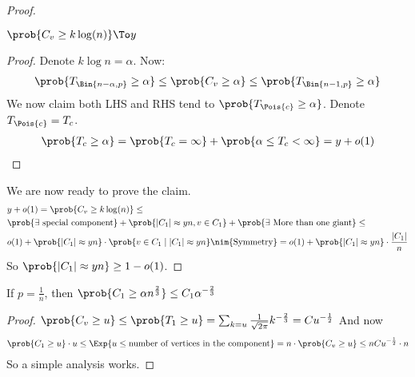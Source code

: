 \documentclass[a4paper, 11pt, oneside]{book}
\begin{document}
\begin{proof}
		\begin{prop}
			$\prob{C_v \ge k\log(n)}\To y$
		\end{prop}
		\begin{proof}
		Denote $k\log n = \alpha$. Now:
		\begin{align*}
			\prob{T_\Bin{n-\alpha,p} \ge \alpha }\le \prob{C_v \ge \alpha}\le \prob{T_\Bin{n-1,p}\ge \alpha}
		\end{align*}
		We now claim both LHS and RHS tend to $\prob{T_\Pois{c}\ge \alpha}$. Denote $T_{\Pois{c}} = T_c$. 
		\begin{align*}
			\prob{T_c \ge \alpha} = \prob{T_c = \infty} + \prob{\alpha \le T_c < \infty} = y + o(1)
		\end{align*}
		\end{proof}
		We are now ready to prove the claim. 
		\begin{align*}
			& y + o(1) =\prob{C_v \ge k\log(n)} \le\\
			& \prob{\exists \text{ special component}} + \prob{|C_1| \approx yn, v\in C_1} + \prob{\exists\text{ More than one giant}} \le\\
			& o(1) + \prob{|C_1| \approx yn}\cdot \prob{v\in C_1\mid |C_1| \approx yn} \nim{\text{Symmetry}}= o(1) + \prob{|C_1| \approx yn}\cdot \frac{|C_1|}{n}
		\end{align*}
		So $\prob{|C_1|\approx yn} \ge 1-o(1)$.
	\end{proof}
	\begin{claim}
		If $p = \frac{1}{n}$, then $\prob{C_1\ge \alpha n^{\frac{2}{3}}}\le C_1\alpha^{-\frac{2}{3}}$
	\end{claim}
	
	\begin{proof}
		$\prob{C_v \ge u}\le \prob{T_1 \ge u} = \sum_{k=u}\frac{1}{\sqrt{2\pi}}k^{-\frac{2}{3}} = Cu^{-\frac{1}{2}}$
		And now
		\begin{align*}
			\prob{C_1\ge u}\cdot u\le \Exp{u\le \text{number of vertices in the component}} = n\cdot\prob{C_v \ge u}\le nCu^{-\frac{1}{2}}\cdot n
		\end{align*}
		So a simple analysis works.
	\end{proof}
\end{document}
